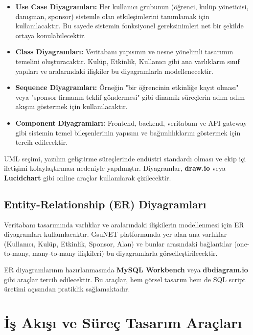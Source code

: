 \documentclass[a4paper,12pt]{report}
\begin{document}
\begin{itemize}
    \item \textbf{Use Case Diyagramları:} Her kullanıcı grubunun (öğrenci, kulüp yöneticisi, danışman, sponsor) sistemle olan etkileşimlerini tanımlamak için kullanılacaktır. Bu sayede sistemin fonksiyonel gereksinimleri net bir şekilde ortaya konulabilecektir.

    \item \textbf{Class Diyagramları:} Veritabanı yapısının ve nesne yönelimli tasarımın temelini oluşturacaktır. Kulüp, Etkinlik, Kullanıcı gibi ana varlıkların sınıf yapıları ve aralarındaki ilişkiler bu diyagramlarla modellenecektir.

    \item \textbf{Sequence Diyagramları:} Örneğin "bir öğrencinin etkinliğe kayıt olması" veya "sponsor firmanın teklif göndermesi" gibi dinamik süreçlerin adım adım akışını göstermek için kullanılacaktır.

    \item \textbf{Component Diyagramları:} Frontend, backend, veritabanı ve API gateway gibi sistemin temel bileşenlerinin yapısını ve bağımlılıklarını göstermek için tercih edilecektir.
\end{itemize}

UML seçimi, yazılım geliştirme süreçlerinde endüstri standardı olması ve ekip içi iletişimi kolaylaştırması nedeniyle yapılmıştır. Diyagramlar, \textbf{draw.io} veya \textbf{Lucidchart} gibi online araçlar kullanılarak çizilecektir.

\subsection{Entity-Relationship (ER) Diyagramları}

Veritabanı tasarımında varlıklar ve aralarındaki ilişkilerin modellenmesi için ER diyagramları kullanılacaktır. GsuNET platformunda yer alan ana varlıklar (Kullanıcı, Kulüp, Etkinlik, Sponsor, Alan) ve bunlar arasındaki bağlantılar (one-to-many, many-to-many ilişkileri) bu diyagramlarla görselleştirilecektir.

ER diyagramlarının hazırlanmasında \textbf{MySQL Workbench} veya \textbf{dbdiagram.io} gibi araçlar tercih edilecektir. Bu araçlar, hem görsel tasarım hem de SQL script üretimi açısından pratiklik sağlamaktadır.

\section{İş Akışı ve Süreç Tasarım Araçları}
\end{document}
